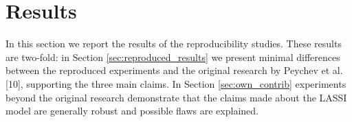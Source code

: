 
\newpage

\section{Results}\label{sec:results}

In this section we report the results of the reproducibility studies. These results are two-fold: in Section \ref{sec:reproduced_results} we present minimal differences between the reproduced experiments and the original research by Peychev et al. [10], supporting the three main claims. In Section \ref{sec:own_contrib} experiments beyond the original research demonstrate that the claims made about the LASSI model are generally robust and possible flaws are explained.




